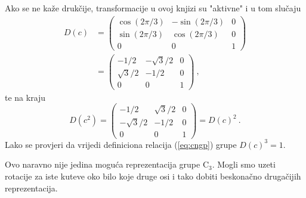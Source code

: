 \begin{primjer}
Ako se ne kaže drukčije, transformacije u ovoj knjizi su "aktivne"
i u tom slučaju
\begin{equation}
\begin{split}
    D(c)& =\left(
\begin{array}{ccc}
\cos(2\pi/3) & -\sin(2\pi/3) & 0 \\
\sin(2\pi/3) & \cos(2\pi/3) & 0 \\
0 & 0 & 1
\end{array}\right) \\
  & =\left(
\begin{array}{ccc}
-1/2 & -\sqrt{3}/2 & 0 \\
\sqrt{3}/2 & -1/2 & 0 \\
0 & 0 & 1
\end{array}\right) \:,
\label{eq:Rc}
\end{split}
\end{equation}
te na kraju
\begin{equation}
D(c^2)=
\left(
\begin{array}{ccc}
-1/2 & \sqrt{3}/2 & 0 \\
-\sqrt{3}/2 & -1/2 & 0 \\
0 & 0 & 1
\end{array}\right) = D(c)^2  \:.
\end{equation}
Lako se provjeri da vrijedi definiciona relacija (\ref{eq:cngp}) grupe
$D(c)^3 = 1$.
\end{primjer}

Ovo naravno nije jedina moguća reprezentacija grupe $\mathrm{C}_3$.
Mogli smo uzeti rotacije za iste kuteve oko bilo koje druge osi i
tako dobiti beskonačno drugačijih reprezentacija.

